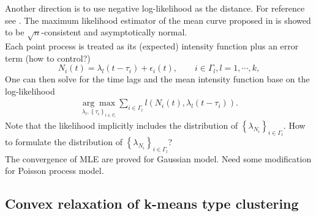 			
			Another direction is to use negative log-likelihood as the distance.
			For reference see \cite{Vimond2010,Gamboa2007,Ronn2009,Gervini2005}.
			The maximum likelihood estimator of the mean curve proposed in \citet{Gervini2005} is showed to be $\sqrt{n}$-consistent and asymptotically normal. %
			\\
			Each point process is treated as its (expected) intensity function plus an error term {\color{red}(how to control?)}
				\begin{equation}\label{eq:SIM of PP}
					{N_i}(t) = \lambda_l(t-\tau_i)+\epsilon_i(t), \qquad i\in\Gamma_l, l=1,\cdots,k,
				\end{equation}
			One can then solve for the time lags and the mean intensity function base on the log-likelihood
				\begin{align*}
				\underset{\lambda_l, \left\{ \tau_i \right\}_{i\in\Gamma_l}}{\arg\max}\sum_{i\in\Gamma_l}l(N_i(t), \lambda_l(t-\tau_i)).
				\end{align*}
			Note that the likelihood implicitly includes the distribution of $\left\{ \lambda_{N_i} \right\}_{i\in\Gamma_l}$. 
			{\color{red} How to formulate the distribution of $\left\{ \lambda_{N_i} \right\}_{i\in\Gamma_l}$?}
			\\
			{\color{blue} The convergence of MLE are proved for Gaussian model. Need some modification for Poisson process model.}

	\subsection{Convex relaxation of k-means type clustering}
